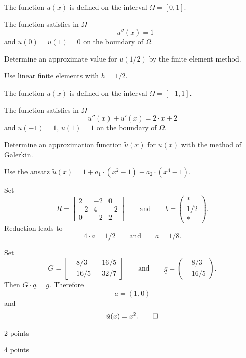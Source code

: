 \begin{teilaufgaben}
\item
{}
The function $u(x)$ is defined on the interval $\Omega = [0, 1]$.

The function satisfies in $\Omega$ 
\[
-u''(x) = 1
\]
and $u(0) = u(1) = 0$ on the boundary of $\Omega$.  

Determine an approximate value for $u(1/2)$ by the finite element method. 

Use linear finite elements with $h = 1/2$.

\item
{}
The function $u(x)$ is defined on the interval $\Omega = [-1, 1].$

The function satisfies in $\Omega$ 
\[
u''(x) + u'(x) = 2 \cdot x + 2
\]
and $u(-1) = 1$, $u(1) = 1$ on the boundary of $\Omega$.  

Determine an approximation function $\tilde u(x)$ for $u(x)$ with the
method of Galerkin.

Use the ansatz $\tilde u(x) = 1 + a_1 \cdot (x^2-1) + a_2 \cdot (x^4-1).$
\end{teilaufgaben}

\begin{loesung}
\begin{teilaufgaben}
\item
Set
\[
R
=
\left[\begin{array}{rrr} 2 & -2 & 0  \\ -2 & 4 & - 2 \\ 0 & -2 & 2 \end{array}\right]
\qquad\text{and}\qquad
\underline{b}
=
\left(\begin{array}{r} * \\ 1/2 \\ * \end{array}\right).
\]
Reduction leads to
\[
4 \cdot a = 1/2
\qquad\text{and}\qquad
a = 1/8.
\]
\item
Set
\[
G
=
\left[\begin{array}{cc} -8/3 & -16/5  \\ -16/5 & -32/7 \end{array}\right]
\qquad\text{and}\qquad
\underline{g}
=
\left(\begin{array}{c} -8/3 \\ -16/5 \end{array}\right).
\]
Then $G \cdot \underline{a} = \underline{g}$.
Therefore 
\[
\underline{a} = (1,0)
\]
and
\[
\tilde u(x) = x^2.
\qedhere
\]
\end{teilaufgaben}
\end{loesung}

\begin{bewertung}
\begin{teilaufgaben}
\item 2 points
\item 4 points
\end{teilaufgaben}
\end{bewertung}
